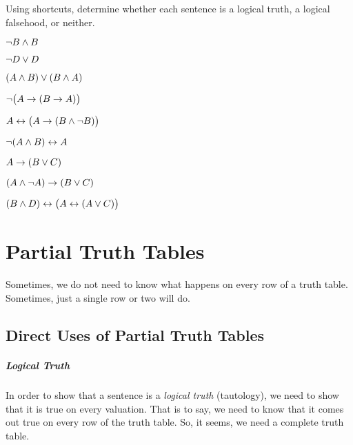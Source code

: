 

\practiceproblems
\problempart
\label{pr.TT.TTorCS}
Using shortcuts, determine whether each sentence is a logical truth, a logical falsehood, or neither. 
\begin{earg}
\item $\neg B \wedge B$ %
\item $\neg D \vee D$ %
\item $(A\wedge B) \vee (B\wedge A)$ %
\item $\neg\bigl(A \rightarrow (B \rightarrow A) \bigr)$ %
\item $A \leftrightarrow \bigl(A \rightarrow (B \wedge \neg B) \bigr)$ %
\item $\neg(A\wedge B) \leftrightarrow A$ %
\item $A\rightarrow(B\vee C)$ %
\item $(A \wedge\neg A) \rightarrow (B \vee C)$ %
\item $(B\wedge D) \leftrightarrow \bigl(A \leftrightarrow(A \vee C) \bigr)$%
\end{earg}


\chapter{Partial Truth Tables}\label{s:PartialTruthTable}

Sometimes, we do not need to know what happens on every row of a truth table. Sometimes, just a single row or two will do. 

\section{Direct Uses of Partial Truth Tables}\label{s:directPartialTruthTable}

\paragraph{Logical Truth} 
In order to show that a sentence is a \emph{logical truth} (tautology), we need to show that it is true on every valuation. That is to say, we need to know that it comes out true on every row of the truth table. So, it seems, we need a complete truth table. 

